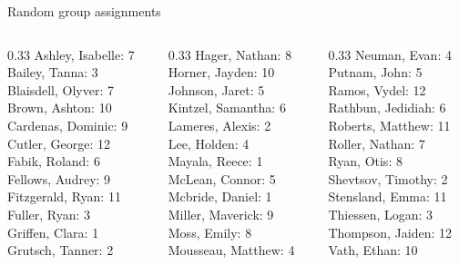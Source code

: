 \documentclass[10pt]{beamer}
\begin{document}
\begin{frame}{Random group assignments}
\begin{columns}
\begin{column}{0.33\textwidth}
Ashley, Isabelle: 7 \\ 
Bailey, Tanna: 3 \\ 
Blaisdell, Olyver: 7 \\ 
Brown, Ashton: 10 \\ 
Cardenas, Dominic: 9 \\ 
Cutler, George: 12 \\ 
Fabik, Roland: 6 \\ 
Fellows, Audrey: 9 \\ 
Fitzgerald, Ryan: 11 \\ 
Fuller, Ryan: 3 \\ 
Griffen, Clara: 1 \\ 
Grutsch, Tanner: 2 \\\end{column}
\begin{column}{0.33\textwidth}
Hager, Nathan: 8 \\ 
Horner, Jayden: 10 \\ 
Johnson, Jaret: 5 \\ 
Kintzel, Samantha: 6 \\ 
Lameres, Alexis: 2 \\ 
Lee, Holden: 4 \\ 
Mayala, Reece: 1 \\ 
McLean, Connor: 5 \\ 
Mcbride, Daniel: 1 \\ 
Miller, Maverick: 9 \\ 
Moss, Emily: 8 \\ 
Mousseau, Matthew: 4 \\\end{column}
\begin{column}{0.33\textwidth}
Neuman, Evan: 4 \\ 
Putnam, John: 5 \\ 
Ramos, Vydel: 12 \\ 
Rathbun, Jedidiah: 6 \\ 
Roberts, Matthew: 11 \\ 
Roller, Nathan: 7 \\ 
Ryan, Otis: 8 \\ 
Shevtsov, Timothy: 2 \\ 
Stensland, Emma: 11 \\ 
Thiessen, Logan: 3 \\ 
Thompson, Jaiden: 12 \\ 
Vath, Ethan: 10 \\\end{column}
\end{columns}
\end{frame}
\end{document}
